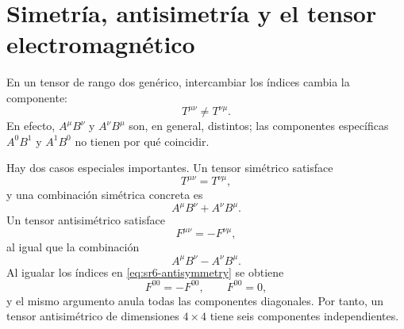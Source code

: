 \begin{classroomqa}\end{classroomqa}

\begin{classroomqa}\end{classroomqa}

\section{Simetría, antisimetría y el tensor electromagnético}

En un tensor de rango dos genérico, intercambiar los índices cambia la componente:
\begin{equation}
T^{\mu\nu}\neq T^{\nu\mu}.
\end{equation}
En efecto, \(A^\mu B^\nu\) y \(A^\nu B^\mu\) son, en general, distintos; las componentes específicas \(A^0B^1\) y \(A^1B^0\) no tienen por qué coincidir.

Hay dos casos especiales importantes. Un tensor simétrico satisface
\begin{equation}
T^{\mu\nu}=T^{\nu\mu},
\end{equation}
y una combinación simétrica concreta es
\begin{equation}
A^\mu B^\nu+A^\nu B^\mu.
\end{equation}
Un tensor antisimétrico satisface
\begin{equation}
F^{\mu\nu}=-F^{\nu\mu},
\label{eq:sr6-antisymmetry}
\end{equation}
al igual que la combinación
\begin{equation}
A^\mu B^\nu-A^\nu B^\mu.
\end{equation}
Al igualar los índices en \eqref{eq:sr6-antisymmetry} se obtiene
\begin{equation}
F^{00}=-F^{00},
\qquad
F^{00}=0,
\end{equation}
y el mismo argumento anula todas las componentes diagonales. Por tanto, un tensor antisimétrico de dimensiones \(4\times4\) tiene seis componentes independientes.

